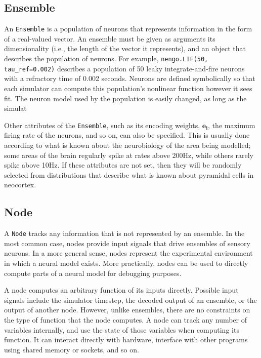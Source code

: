 \documentclass{frontiersSCNS}
\begin{document}
\subsection{Ensemble}

An \texttt{Ensemble} is
a population of neurons
that represents information
in the form of a real-valued vector.
An ensemble must be given as arguments
its dimensionality
(i.e., the length of the vector it represents),
and an object that describes
the population of neurons.
For example, \texttt{nengo.LIF(50, tau\_ref=0.002)}
describes a population
of 50 leaky integrate-and-fire neurons
with a refractory time of 0.002 seconds.
Neurons are defined symbolically
so that each simulator can compute
this population's nonlinear function
however it sees fit.
The neuron model used by the population
is easily changed, as long as the simulat

Other attributes of the \texttt{Ensemble},
such as its encoding weights, $\mathbf{e_i}$,
the maximum firing rate of the neurons,
and so on, can also be specified.
This is usually done according
to what is known about
the neurobiology of the area being modelled;
some areas of the brain regularly spike
at rates above 200Hz,
while others rarely spike above 10Hz.
If these attributes are not set,
then they will be randomly selected
from distributions that describe
what is known about pyramidal cells in neocortex.

\subsection{Node}
A \texttt{Node} tracks any information
that is not represented by an ensemble.
In the most common case,
nodes provide input signals
that drive ensembles of sensory neurons.
In a more general sense,
nodes represent the experimental environment
in which a neural model exists.
More practically,
nodes can be used to directly compute
parts of a neural model
for debugging purposes.

A node computes an arbitrary function
of its inputs directly.
Possible input signals include
the simulator timestep,
the decoded output of an ensemble,
or the output of another node.
However, unlike ensembles,
there are no constraints on the type
of function that the node computes.
A node can track any number of variables internally,
and use the state of those variables
when computing its function.
It can interact directly with hardware,
interface with other programs
using shared memory or sockets,
and so on.
\end{document}
